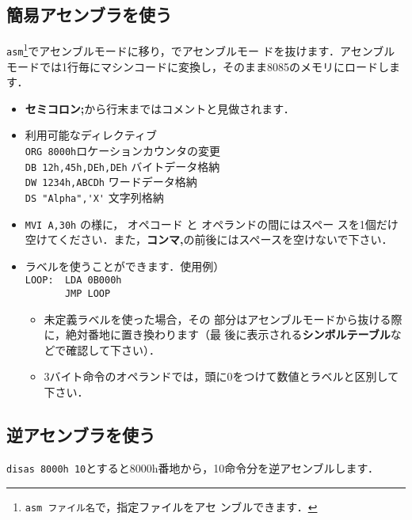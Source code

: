 \documentclass{jsarticle}
\begin{document}
\subsection{簡易アセンブラを使う}
\verb|asm|\return \footnote{\verb|asm ファイル名|\return で，指定ファイルをアセ
ンブルできます．}でアセンブルモードに移り，\return でアセンブルモー
ドを抜けます．アセンブルモードでは1行毎にマシンコードに変換し，そのまま8085のメモリにロードします．
\begin{itemize}
\item {\bf セミコロン;}から行末まではコメントと見做されます．
\item 利用可能なディレクティブ\\
\verb|ORG 8000h|\dotfill ロケーションカウンタの変更\\
\verb|DB 12h,45h,DEh,DEh| \dotfill バイトデータ格納\\
\verb|DW 1234h,ABCDh| \dotfill ワードデータ格納\\
\verb|DS "Alpha",'X'| \dotfill 文字列格納\\
\item   \verb|MVI A,30h| の様に， オペコード と オペランドの間にはスペー
	スを1個だけ空けてください．また，{\bf コンマ,}の前後にはスペースを空けないで下さい．
\item ラベルを使うことができます．使用例）\\
\verb|LOOP:  LDA 0B000h|\\
\verb|       JMP LOOP|
\begin{itemize}
\item 未定義ラベルを使った場合，その
      部分はアセンブルモードから抜ける際に，絶対番地に置き換わります（最
      後に表示される{\bf シンボルテーブル}などで確認して下さい）．
\item 3バイト命令のオペランドでは，頭に0をつけて数値とラベルと区別して下さい．
\end{itemize}
 \end{itemize}
\subsection{逆アセンブラを使う}
\verb|disas 8000h 10|\return とすると8000h番地から，10命令分を逆アセンブルします．
\end{document}
